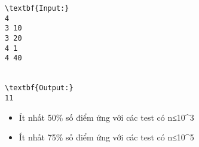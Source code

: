 \begin{verbatim}
\textbf{Input:}
4
3 10
3 20
4 1
4 40


\textbf{Output:}
11 \end{verbatim}
\begin{itemize}
	\item     Ít nhất 50\% số điểm ứng với các test có n≤10^3   
	\item     Ít nhất 75\% số điểm ứng với các test có n≤10^5   
\end{itemize}